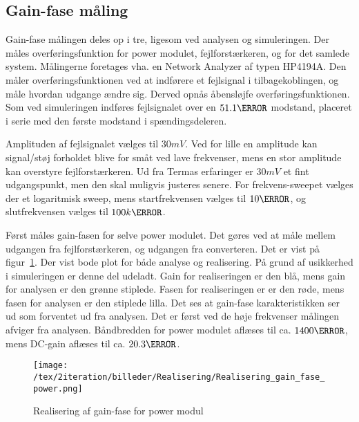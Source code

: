 \subsection{Gain-fase måling} \label{gain_fase_2}
Gain-fase målingen deles op i tre, ligesom ved analysen og simuleringen. Der måles overføringsfunktion for power modulet, fejlforstærkeren, og for det samlede system. Målingerne foretages vha. en Network Analyzer af typen HP4194A. Den måler overføringsfunktionen ved at indførere et fejlsignal i tilbagekoblingen, og måle hvordan udgange ændre sig. Derved opnås åbensløjfe overføringsfunktionen. Som ved simuleringen indføres fejlsignalet over en $51.1\ohm$ modstand, placeret i serie med den første modstand i spændingsdeleren. 

Amplituden af fejlsignalet vælges til $30mV$. Ved for lille en amplitude kan signal/støj forholdet blive for småt ved lave frekvenser, mens en stor amplitude kan overstyre fejlforstærkeren. Ud fra Termas erfaringer er $30mV$ et fint udgangspunkt, men den skal muligvis justeres senere. For frekvens-sweepet vælges der et logaritmisk sweep, mens startfrekvensen vælges til $10\hertz$, og slutfrekvensen vælges til $100k\hertz$. 

Først måles gain-fasen for selve power modulet. Det gøres ved at måle mellem udgangen fra fejlforstærkeren, og udgangen fra converteren. Det er vist på figur~\ref{fig:realisering_gain_fase_power}. Der vist bode plot for både analyse og realisering. På grund af usikkerhed i simuleringen er denne del udeladt. Gain for realiseringen er den blå, mens gain for analysen er den grønne stiplede. Fasen for realiseringen er er den røde, mens fasen for analysen er den stiplede lilla. Det ses at gain-fase karakteristikken ser ud som forventet ud fra analysen. Det er først ved de høje frekvenser målingen afviger fra analysen. Båndbredden for power modulet aflæses til ca. $1400\hertz$, mens DC-gain aflæses til ca. $20.3\decibel$.

\begin{figure}[H]
	\center
	\texttt{[image: /tex/2iteration/billeder/Realisering/Realisering\_gain\_fase\_power.png]}
	\caption{Realisering af gain-fase for power modul}
	\label{fig:realisering_gain_fase_power}
\end{figure}




